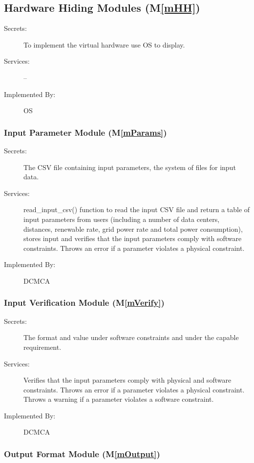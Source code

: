 \documentclass[12pt]{article}
\newcommand{\mref}[1]{M\ref{#1}}
\begin{document}
\subsection{Hardware Hiding Modules (\mref{mHH})}

\begin{description}
\item[Secrets:] To implement the virtual hardware use OS to display.
\item[Services:] --
\item[Implemented By:] OS
\end{description}

\subsubsection{Input Parameter Module (\mref{mParams})}

\begin{description}
\item[Secrets:] The CSV file containing input parameters, the system of files for input data.
\item[Services:] read_input_csv() function to read the input CSV file and return a table of input parameters from users (including 
  a number of data centers, distances, renewable rate, grid power rate and total power consumption), stores input and verifies that the input parameters comply with software constraints. Throws an error if a parameter violates a physical constraint.
\item[Implemented By:] DCMCA
\end{description} 
 \subsubsection{Input Verification Module (\mref{mVerify})}

\begin{description}
\item[Secrets:]  The format and value under software constraints and under the capable requirement.
\item[Services:] Verifies that the input parameters comply with physical and
   software constraints. Throws an error if a parameter violates a physical
   constraint. Throws a warning if a parameter violates a software constraint.
\item[Implemented By:] DCMCA
\end{description}

\subsubsection{Output Format Module (\mref{mOutput})}
\end{document}
